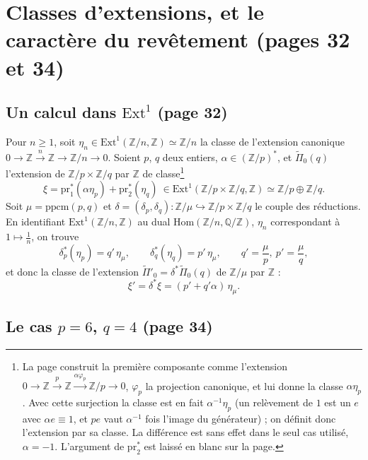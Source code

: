 \documentclass[11pt,a4paper]{article}
\begin{document}
\section*{Classes d'extensions, et le caractère du revêtement (pages 32 et 34)}

\subsection*{Un calcul dans $\mathrm{Ext}^1$ (page 32)}

Pour $n \geqslant 1$, soit $\eta_n \in \mathrm{Ext}^1(\mathbb{Z}/n, \mathbb{Z})
\simeq \mathbb{Z}/n$ la classe de l'extension canonique
$0 \to \mathbb{Z} \xrightarrow{n} \mathbb{Z} \to \mathbb{Z}/n \to 0$. Soient $p$,
$q$ deux entiers, $\alpha \in (\mathbb{Z}/p)^{*}$, et $\widetilde{\Pi}_0(q)$
l'extension de $\mathbb{Z}/p \times \mathbb{Z}/q$ par $\mathbb{Z}$ de classe\footnote{La page construit la première composante comme l'extension
$0 \to \mathbb{Z} \xrightarrow{p} \mathbb{Z} \xrightarrow{\alpha\varphi_p}
\mathbb{Z}/p \to 0$, $\varphi_p$ la projection canonique, et lui donne la classe
$\alpha\eta_p$. Avec cette surjection la classe est en fait $\alpha^{-1}\eta_p$
(un relèvement de $1$ est un $e$ avec $\alpha e \equiv 1$, et $pe$ vaut
$\alpha^{-1}$ fois l'image du générateur) ; on définit donc l'extension par sa
classe. La différence est sans effet dans le seul cas utilisé, $\alpha = -1$.
L'argument de $\mathrm{pr}_2^{*}$ est laissé en blanc sur la page.}
\[
\xi = \mathrm{pr}_1^{*}(\alpha\eta_p) + \mathrm{pr}_2^{*}(\eta_q)
\ \in \mathrm{Ext}^1(\mathbb{Z}/p \times \mathbb{Z}/q, \mathbb{Z})
\simeq \mathbb{Z}/p \oplus \mathbb{Z}/q .
\]
 Soit
$\mu = \mathrm{ppcm}(p, q)$ et $\delta = (\delta_p, \delta_q) : \mathbb{Z}/\mu
\hookrightarrow \mathbb{Z}/p \times \mathbb{Z}/q$ le couple des réductions. En
identifiant $\mathrm{Ext}^1(\mathbb{Z}/n, \mathbb{Z})$ au dual
$\mathrm{Hom}(\mathbb{Z}/n, \mathbb{Q}/\mathbb{Z})$, $\eta_n$ correspondant à
$1 \mapsto \frac1n$, on trouve
\[
\delta_p^{*}(\eta_p) = q'\,\eta_\mu, \qquad \delta_q^{*}(\eta_q) = p'\,\eta_\mu,
\qquad q' = \frac{\mu}{p},\ p' = \frac{\mu}{q} ,
\]
et donc la classe de l'extension $\widetilde{\Pi}'_0 = \delta^{*}\widetilde{\Pi}_0(q)$
de $\mathbb{Z}/\mu$ par $\mathbb{Z}$ :
\[
\xi' = \delta^{*}\xi = (p' + q'\alpha)\,\eta_\mu .
\]

\subsection*{Le cas $p = 6$, $q = 4$ (page 34)}
\end{document}
